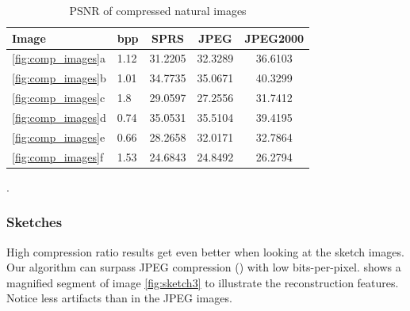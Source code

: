 \begin{table}[h]
\centering

\begin{tabular}{| l l | c | c | c|}
\hline\hline
Image & bpp & SPRS & JPEG & JPEG2000 \\
\hline
\ref{fig:comp_images}a & 1.12 & 31.2205 & 32.3289 & 36.6103 \\
\hline
\ref{fig:comp_images}b & 1.01 & 34.7735 & 35.0671 & 40.3299 \\
\hline
\ref{fig:comp_images}c & 1.8  & 29.0597 & 27.2556 & 31.7412 \\
\hline
\ref{fig:comp_images}d & 0.74 & 35.0531 & 35.5104 & 39.4195 \\
\hline
\ref{fig:comp_images}e & 0.66 & 28.2658 & 32.0171 & 32.7864 \\
\hline
\ref{fig:comp_images}f & 1.53 & 24.6843  & 24.8492 & 26.2794 \\
\hline
\end{tabular}
\caption{PSNR of compressed natural images}
\label{tab:compression1}.
\end{table} 


\subsubsection{Sketches}
High compression ratio results get even better when looking at the sketch
images. Our algorithm can surpass JPEG compression
() with low bits-per-pixel.
 shows a magnified segment of image
\ref{fig:sketch3} to illustrate the reconstruction features. Notice less
artifacts than in the JPEG images.

